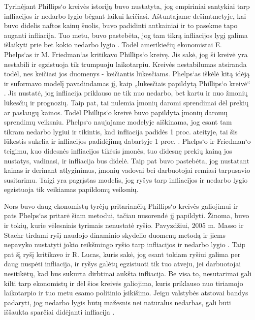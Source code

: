\documentclass[11pt, titlepage]{article}
\begin{document}
Tyrinėjant Phillips‘o kreivės istoriją buvo nustatyta, jog empiriniai santykiai tarp infliacijos ir nedarbo lygio bėgant laikui keičiasi. Aštuntajame dešimtmetyje, kai buvo didelis naftos kainų šuolis, buvo padidinti antkainiai ir to pasekme tapo auganti infliacija. Tuo metu, buvo pastebėta, jog tam tikrą infliacijos lygį galima išlaikyti prie bet kokio nedarbo lygio \cite{lacker2007inflation}. Todėl amerikiečių ekonomistai E. Phelps‘as ir M. Friedman‘as kritikavo Phillips‘o kreivę. Jis sakė, jog ši kreivė yra nestabili ir egzistuoja tik trumpuoju laikotarpiu. Kreivės nestabilumas atsiranda todėl, nes keičiasi jos duomenys - keičiantis lūkesčiams. Phelps‘as iškėlė kitą idėją ir suformavo modelį pavadindamas jį, kaip „lūkesčiais papildytą Phillips‘o kreivė“ \cite{kareivaite2007ryvsio}.  Jis nustatė, jog infliacija priklauso ne tik nuo nedarbo, bet kartu ir nuo žmonių lūkesčių ir prognozių. Taip pat, tai nulemia įmonių daromi sprendimai dėl prekių ar paslaugų kainos. Todėl Phillips‘o kreivė buvo papildyta įmonių daromų sprendimų veiksniu. Phelps‘o naujajame modelyje aiškinama, jog esant tam tikram nedarbo lygiui ir tikintis, kad infliacija padidės 1 proc. ateityje, tai šis lūkestis sukelia ir infliacijos padidėjimą dabartyje 1 proc. \cite{prialgauskas2012nedarbo}. Phelps‘o ir Friedman‘o teigimu, kuo didesnės infliacijos tikėsis įmonės, tuo didesnę prekių kainą jos nustatys, vadinasi, ir infliacija bus didelė. Taip pat buvo pastebėta, jog nustatant kainas ir derinant atlyginimus, įmonių vadovai bei darbuotojai remiasi tarpusavio susitarimu. Taigi yra pagrįstas modelis, jog ryšys tarp infliacijos ir nedarbo lygio egzistuoja tik veikiamas papildomų veiksnių. 

Nors buvo daug ekonomistų tyrėjų pritariančių Phillips‘o kreivės galiojimui ir pats Phelps‘as pritarė šiam metodui, tačiau nusorendė jį papildyti. Žinoma, buvo ir tokių, kurie vėlesniais tyrimais nenustatė ryšio. Pavyzdžiui, 2005 m. Masso ir Staehr  tirdami ryšį naudojo dinaminio skydelio duomenų metodą ir jiems nepavyko nustatyti jokio reikšmingo ryšio tarp infliacijos ir nedarbo lygio \cite{furuoka2007does}. Taip pat šį ryšį kritikavo ir R. Lucas, kuris sakė, jog esant tokiam ryšiui galima per daug nuspėti infliacija, ir ryšys galėtų egzistuoti tik tuo atveju, jei darbuotojai nesitikėtų, kad bus sukurta dirbtinai aukšta infliacija. Be visa to, nesutarimai gali kilti tarp ekonomistų ir dėl šios kreivės galiojimo, kuris priklauso nuo tiriamojo laikotarpio ir tuo metu esamo politinio įsikišimo. Jeigu valstybės atstovai bandys padaryti, jog nedarbo lygis būtų mažesnis nei natūralus nedarbas, gali būti iššaukta sparčiai didėjanti infliacija \cite{picardo_2019}.   
\end{document}
